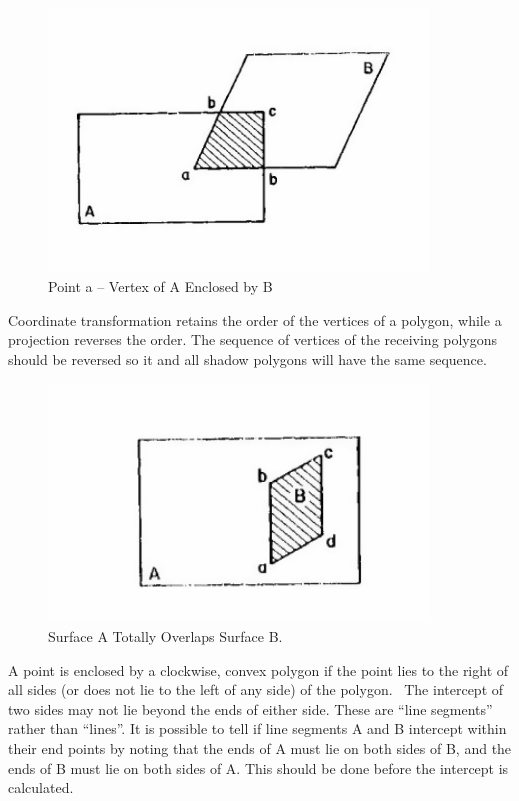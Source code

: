\begin{figure}[hbtp] %
\centering
\includegraphics[width=0.9\textwidth, height=0.9\textheight, keepaspectratio=true]{media/image637.png}
\caption{Point a – Vertex of A Enclosed by B \protect \label{fig:point-a-vertex-of-a-enclosed-by-b}}
\end{figure}

Coordinate transformation retains the order of the vertices of a polygon, while a projection reverses the order. The sequence of vertices of the receiving polygons should be reversed so it and all shadow polygons will have the same sequence.

\begin{figure}[hbtp] %
\centering
\includegraphics[width=0.9\textwidth, height=0.9\textheight, keepaspectratio=true]{media/image638.png}
\caption{Surface A Totally Overlaps Surface B. \protect \label{fig:surface-a-totally-overlaps-surface-b.}}
\end{figure}

A point is enclosed by a clockwise, convex polygon if the point lies to the right of all sides (or does not lie to the left of any side) of the polygon.~ The intercept of two sides may not lie beyond the ends of either side. These are ``line segments'' rather than ``lines''. It is possible to tell if line segments A and B intercept within their end points by noting that the ends of A must lie on both sides of B, and the ends of B must lie on both sides of A. This should be done before the intercept is calculated.


